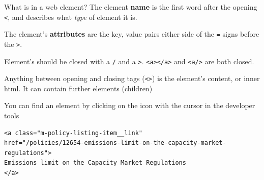 \documentclass[
  10pt,
  ignorenonframetext,
  aspectratio=169]{beamer}
\begin{document}
\begin{frame}[fragile]{What is in a web element?}
\protect\hypertarget{what-is-in-a-web-element}{}
The element \textbf{name} is the first word after the opening
\texttt{\textless{}}, and describes what \emph{type} of element it is.

The element's \textbf{attributes} are the key, value pairs either side
of the \texttt{=} signs before the \texttt{\textgreater{}}.

Element's should be closed with a \texttt{/} and a
\texttt{\textgreater{}}.
\texttt{\textless{}a\textgreater{}\textless{}/a\textgreater{}} and
\texttt{\textless{}a/\textgreater{}} are both closed.

Anything between opening and closing tags
(\texttt{\textless{}\textgreater{}}) is the element's content, or inner
html. It can contain further elements (children)

You can find an element by clicking on the icon with the cursor in the
developer tools

\begin{verbatim}
<a class="m-policy-listing-item__link" 
href="/policies/12654-emissions-limit-on-the-capacity-market-regulations">
Emissions limit on the Capacity Market Regulations
</a>
\end{verbatim}
\end{frame}
\end{document}
